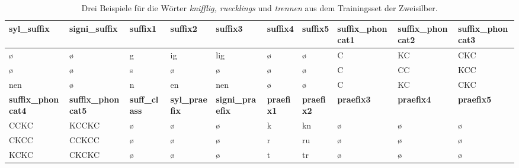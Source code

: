 \begin{table}[p]
\centering
\tiny
\caption{Drei Beispiele für die Wörter \textit{knifflig, ruecklings} und \textit{trennen} aus dem Trainingsset der Zweisilber.}
\label{table:data_example}
\begin{tabular}{|p{2cm}|p{2cm}|p{2cm}|p{2cm}|p{2cm}|p{1.5cm}|p{1.5cm}|p{1.5cm}|p{1.8cm}|p{1.8cm}|}
\hline
{\bf syl\_suffix}       & {\bf signi\_suffix}     & {\bf suffix1}           & {\bf suffix2}           & {\bf suffix3}           & {\bf suffix4}       & {\bf suffix5}       & {\bf suffix\_phoncat1} & {\bf suffix\_phoncat2} & {\bf suffix\_phoncat3} \\\hline
ø                       & ø                       & g                       & ig                      & lig                     & ø                   & ø                   & C                      & KC                     & CKC                    \\
ø                       & ø                       & s                       & ø                       & ø                       & ø                   & ø                   & C                      & CC                     & KCC                    \\
nen                     & ø                       & n                       & en                      & nen                     & ø                   & ø                   & C                      & KC                     & CKC                    \\\hline
\hline
{\bf suffix\_phoncat4}  & {\bf suffix\_phoncat5}  & {\bf suff\_class}       & {\bf syl\_praefix}      & {\bf signi\_praefix}    & {\bf praefix1}      & {\bf praefix2}      & {\bf praefix3}         & {\bf praefix4}         & {\bf praefix5}         \\
CCKC                    & KCCKC                   & ø                       & ø                       & ø                       & k                   & kn                  & ø                      & ø                      & ø                      \\
CKCC                    & CCKCC                   & ø                       & ø                       & ø                       & r                   & ru                  & ø                      & ø                      & ø                      \\
KCKC                    & CKCKC                   & ø                       & ø                       & ø                       & t                   & tr                  & ø                      & ø                      & ø                      \\\hline

\end{tabular}
\end{table}

